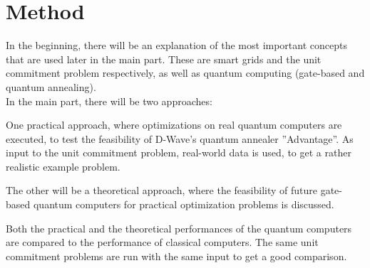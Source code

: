 \section{Method}

In the beginning, there will be an explanation of the most important concepts
that are used later in the main part.
These are smart grids and the unit commitment problem respectively,
as well as quantum computing (gate-based and quantum annealing).\\

\noindent In the main part, there will be two approaches:

One practical approach, where optimizations on real quantum computers are executed,
to test the feasibility of D-Wave's quantum annealer ''Advantage''.
As input to the unit commitment problem, real-world data is used, to get a rather realistic example problem.

The other will be a theoretical approach, where the feasibility of future gate-based quantum computers
for practical optimization problems is discussed.

Both the practical and the theoretical performances of the quantum computers
are compared to the performance of classical computers.
The same unit commitment problems are run with the same input to get a good comparison.
